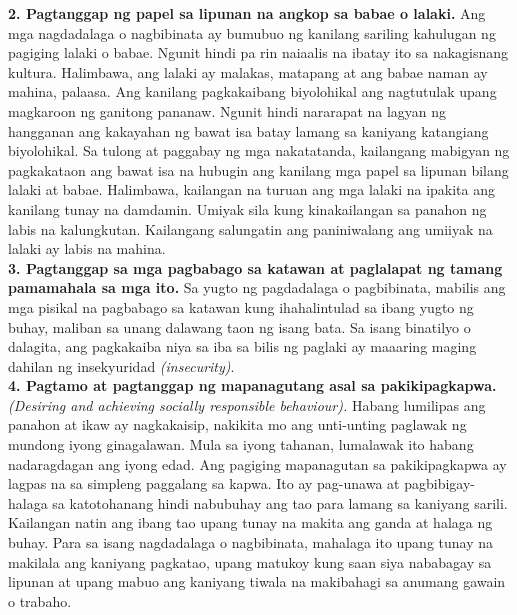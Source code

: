 \documentclass[10pt,a4paper]{article}
\begin{document}
\begin{multicols*}{3}
\textbf{2. Pagtanggap ng papel sa lipunan na angkop sa babae o lalaki.} Ang mga nagdadalaga o nagbibinata ay bumubuo ng kanilang sariling kahulugan ng pagiging lalaki o babae. Ngunit hindi pa rin naiaalis na ibatay ito sa nakagisnang kultura. Halimbawa, ang lalaki ay malakas, matapang at ang babae naman ay mahina, palaasa. Ang kanilang pagkakaibang biyolohikal ang nagtutulak upang magkaroon ng ganitong pananaw. Ngunit hindi nararapat na lagyan ng hangganan ang kakayahan ng bawat isa batay lamang sa kaniyang katangiang biyolohikal. Sa tulong at paggabay ng mga nakatatanda, kailangang mabigyan ng pagkakataon ang bawat isa na hubugin ang kanilang mga papel sa lipunan bilang lalaki at babae. Halimbawa, kailangan na turuan ang mga lalaki na ipakita ang kanilang tunay na damdamin. Umiyak sila kung kinakailangan sa panahon ng labis na kalungkutan. Kailangang salungatin ang paniniwalang ang umiiyak na lalaki ay labis na mahina.\\

\textbf{3. Pagtanggap sa mga pagbabago sa katawan at paglalapat ng tamang pamamahala sa mga ito.} Sa yugto ng pagdadalaga o pagbibinata, mabilis ang mga pisikal na pagbabago sa katawan kung ihahalintulad sa ibang yugto ng buhay, maliban sa unang dalawang taon ng isang bata. Sa isang binatilyo o dalagita, ang pagkakaiba niya sa iba sa bilis ng paglaki ay maaaring maging dahilan ng insekyuridad \textit{(insecurity)}.\\

\textbf{4. Pagtamo at pagtanggap ng mapanagutang asal sa pakikipagkapwa.} \textit{(Desiring and achieving socially responsible behaviour).} Habang lumilipas ang panahon at ikaw ay nagkakaisip, nakikita mo ang unti-unting paglawak ng mundong iyong ginagalawan. Mula sa iyong tahanan, lumalawak ito habang nadaragdagan ang iyong edad. Ang pagiging mapanagutan sa pakikipagkapwa ay lagpas na sa simpleng paggalang sa kapwa. Ito ay pag-unawa at pagbibigay-halaga sa katotohanang hindi nabubuhay ang tao para lamang sa kaniyang sarili. Kailangan natin ang ibang tao upang tunay na makita ang ganda at halaga ng buhay. Para sa isang nagdadalaga o nagbibinata, mahalaga ito upang tunay na makilala ang kaniyang pagkatao, upang matukoy kung saan siya nababagay sa lipunan at upang mabuo ang kaniyang tiwala na makibahagi sa anumang gawain o trabaho.\\


\end{multicols*}
\end{document}
